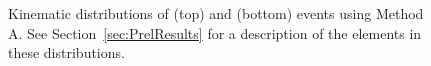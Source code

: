 \documentclass[12pt,twoside,letterpaper,doublespace]{article}
\begin{document}
\clearpage

\begin{figure}[h!]
\label{fig:pjSetTwo}
\centering
\caption[Method A \phoonejet]{Kinematic distributions of \phoonejet (top) and \photwojet (bottom) events using Method A. See Section~\ref{sec:PrelResults} for a description of the elements in these distributions.}
\subfigure[]

\end{figure}
\end{document}

